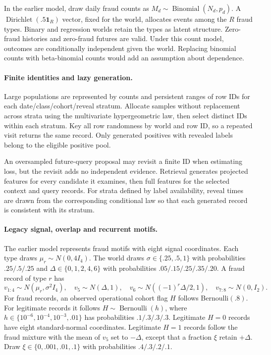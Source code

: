 \documentclass[11pt]{article}
\begin{document}
In the earlier model, draw daily fraud counts as $M_d\sim\operatorname{Binomial}(N_d,p_d)$. A $\operatorname{Dirichlet}(.5\boldsymbol{1}_R)$ vector, fixed for the world, allocates events among the $R$ fraud types. Binary and regression worlds retain the types as latent structure. Zero-fraud histories and zero-fraud futures are valid. Under this count model, outcomes are conditionally independent given the world. Replacing binomial counts with beta-binomial counts would add an assumption about dependence.

\paragraph{Finite identities and lazy generation.} Large populations are represented by counts and persistent ranges of row IDs for each date/class/cohort/reveal stratum. Allocate samples without replacement across strata using the multivariate hypergeometric law, then select distinct IDs within each stratum. Key all row randomness by world and row ID, so a repeated visit returns the same record. Only generated positives with revealed labels belong to the eligible positive pool.

An oversampled future-query proposal may revisit a finite ID when estimating loss, but the revisit adds no independent evidence. Retrieval generates projected features for every candidate it examines, then full features for the selected context and query records. For strata defined by label availability, reveal times are drawn from the corresponding conditional law so that each generated record is consistent with its stratum.

\paragraph{Legacy signal, overlap and recurrent motifs.} The earlier model represents fraud motifs with eight signal coordinates. Each type draws $\mu_r\sim N(0,4I_4)$. The world draws $\sigma\in\{.25,.5,1\}$ with probabilities $.25/.5/.25$ and $\Delta\in\{0,1,2,4,6\}$ with probabilities $.05/.15/.25/.35/.20$. A fraud record of type $r$ has
\[
v_{1:4}\sim N(\mu_r,\sigma^2I_4),\quad
v_5\sim N(\Delta,1),\quad
v_6\sim N((-1)^r\Delta/2,1),\quad
v_{7:8}\sim N(0,I_2).
\]
For fraud records, an observed operational cohort flag $H$ follows Bernoulli$(.8)$. For legitimate records it follows $H\sim\operatorname{Bernoulli}(h)$, where $h\in\{10^{-6},10^{-4},10^{-3},.01\}$ has probabilities $.1/.3/.3/.3$. Legitimate $H=0$ records have eight standard-normal coordinates. Legitimate $H=1$ records follow the fraud mixture with the mean of $v_5$ set to $-\Delta$, except that a fraction $\xi$ retain $+\Delta$. Draw $\xi\in\{0,.001,.01,.1\}$ with probabilities $.4/.3/.2/.1$.
\end{document}
